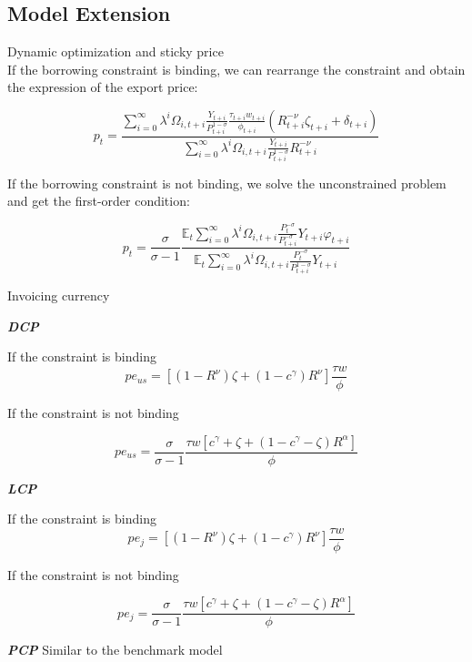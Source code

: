 \documentclass[10pt]{beamer}
\begin{document}
\subsection{Model Extension}

\begin{frame}[label=appendix_model_extension]{Dynamic optimization and sticky price} 
\hyperlink{model_extension}{}\\
If the borrowing constraint is binding, we can rearrange the constraint and obtain the expression of the export price:

\begin{equation}
p_t=\frac{\sum_{i=0}^{\infty} \lambda^i \Omega_{i,t+i}\frac{Y_{t+i}}{P_{t+i}^{1-\sigma}}\frac{\tau_{t+i}w_{t+i}}{\phi_{t+i}}(R_{t+i}^{-\nu}\zeta_{t+i}+\delta_{t+i})}{\sum_{i=0}^{\infty} \lambda^i \Omega_{i,t+i}\frac{Y_{t+i}}{P_{t+i}^{1-\sigma}}R_{t+i}^{-\nu}}
\end{equation}

If the borrowing constraint is not binding, we solve the unconstrained problem and get the first-order condition:

\begin{equation}
p_t=\frac{\sigma}{\sigma-1}\frac{\mathbb{E}_t \sum_{i=0}^{\infty} \lambda^i \Omega_{i,t+i}\frac{P_t^{-\sigma}}{P_{t+i}^{-\sigma}}Y_{t+i}\varphi_{t+i}}{\mathbb{E}_t \sum_{i=0}^{\infty} \lambda^i \Omega_{i,t+i}\frac{P_t^{-\sigma}}{P_{t+i}^{1-\sigma}}Y_{t+i}}
\end{equation}

\end{frame}

\begin{frame}{Invoicing currency}

\textbf{\textit{DCP}}

If the constraint is binding
$$
pe_{us}=[(1-R^{\nu})\zeta+(1-c^\gamma)R^{\nu}] \frac{\tau w}{\phi}
$$

If the constraint is not binding

$$
pe_{us}=\frac{\sigma}{\sigma-1}\frac{\tau w [c^\gamma+\zeta+(1-c^\gamma-\zeta) R^\alpha]}{\phi}
$$

\textbf{\textit{LCP}}

If the constraint is binding
$$
pe_{j}=[(1-R^{\nu})\zeta+(1-c^\gamma)R^{\nu}] \frac{\tau w}{\phi}
$$

If the constraint is not binding

$$
pe_{j}=\frac{\sigma}{\sigma-1}\frac{\tau w [c^\gamma+\zeta+(1-c^\gamma-\zeta) R^\alpha]}{\phi}
$$

\textbf{\textit{PCP}}
Similar to the benchmark model

\end{frame}
\end{document}
